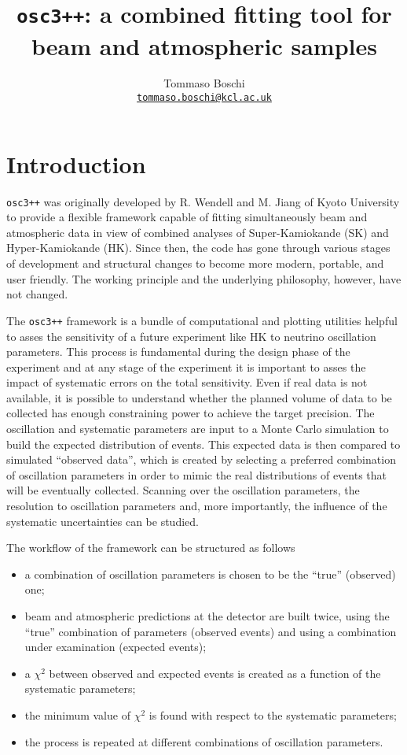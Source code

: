 \documentclass[a4paper, 11pt]{article}
\title{\texttt{osc3++}: a combined fitting tool for \\ beam and atmospheric samples}
\author{Tommaso Boschi \\ \href{mailto:tommaso.boschi@kcl.ac.uk}{\small \tt tommaso.boschi@kcl.ac.uk}}
\begin{document}
\maketitle

\selectfont


\section{Introduction}
\label{sec:intro}
\texttt{osc3++} was originally developed by R. Wendell and M. Jiang of Kyoto University %
to provide a flexible framework capable of fitting simultaneously beam and atmospheric data %
in view of combined analyses of Super-Kamiokande (SK) and Hyper-Kamiokande (HK).
Since then, the code has gone through various stages of development and structural changes %
to become more modern, portable, and user friendly.
The working principle and the underlying philosophy, however, have not changed.

The \texttt{osc3++} framework is a bundle of computational and plotting utilities helpful to asses the sensitivity %
of a future experiment like HK to neutrino oscillation parameters.
This process is fundamental during the design phase of the experiment and  %
at any stage of the experiment it is important to asses the impact of systematic errors on the total sensitivity.
Even if real data is not available, it is possible to understand whether the planned volume of data to be collected %
has enough constraining power to achieve the target precision.
The oscillation and systematic parameters are input to a Monte Carlo simulation %
to build the expected distribution of events.
This expected data is then compared to simulated ``observed data'', which is created by selecting %
a preferred combination of oscillation parameters in order to mimic the real distributions of events %
that will be eventually collected.
Scanning over the oscillation parameters, the resolution to oscillation parameters and, more importantly, %
the influence of the systematic uncertainties can be studied.

The workflow of the framework can be structured as follows
\begin{itemize}
	\item a combination of oscillation parameters is chosen to be the ``true'' (observed) one;
	\item beam and atmospheric predictions at the detector are built twice, using the ``true'' %
		combination of parameters (observed events) and using a combination under examination (expected events);
	\item a $\chi^2$ between observed and expected events is created as a function of the systematic parameters;
	\item the minimum value of $\chi^2$ is found with respect to the systematic parameters;
	\item the process is repeated at different combinations of oscillation parameters.
\end{itemize}
\end{document}
